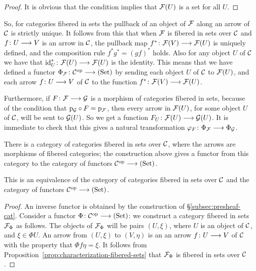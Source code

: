 \begin{3   FIBERED CATEGORIES}
\begin{3.4 Functors and cats fibered in sets}
\begin{proof}
It is obvious that the condition implies that $\mathcal{F}(U)$ is a set for all $U$.
\end{proof}


So, for categories fibered in sets the pullback of an object of $\mathcal{F}$ along an arrow of $\mathcal{C}$ is strictly unique. It follows from this that when $\mathcal{F}$ is fibered in sets over $\mathcal{C}$ and $f \colon U \arr V$ is an arrow in $\mathcal{C}$, the pullback map $f^* \colon \cF(V) \arr \cF(U)$ is uniquely defined, and the composition rule $f^*g^* = (gf)^*$ holds.  Also for any object $U$ of $\mathcal{C}$ we have that $\id_U^* \colon \cF(U) \arr \cF(U)$ is the identity. This means that we have defined a functor $\Phi_\cF \colon \cC\op \arr \catset$ by sending each object $U$ of $\mathcal{C}$ to $\mathcal{F}(U)$, and each arrow $f \colon U \arr V$ of $\mathcal{C}$ to the function $f^* \colon \cF(V) \arr \cF(U)$.

Furthermore, if $F \colon \cF \arr \cG$ is a morphism of categories fibered in sets, because of the condition that $\mathrm{p}_{\mathcal{G}} \circ F = \mathrm{p}_{\mathcal{F}}$, then every arrow in $\mathcal{F}(U)$, for some object $U$ of $\mathcal{C}$, will be sent to $\mathcal{G}(U)$. So we get a function $F_U \colon \cF(U) \arr \cG(U)$. It is immediate to check that this gives a natural transformation $\phi_F \colon \Phi_\cF \arr \Phi_\cG$.

There is a category of categories fibered in sets over $\mathcal{C}$, where the arrows are morphisms of fibered categories; the construction above gives a functor from this category to the category of functors $\cC\op \arr \catset$.

\begin{proposition}

This is an equivalence of the category of categories fibered in sets over $\mathcal{C}$ and the category of functors $\cC\op \arr \catset$.
\end{proposition}

\begin{proof} An inverse functor is obtained by the construction of \S\ref{subsec:presheaf-cat}. Consider a functor $\Phi \colon \cC\op \arr \catset $: we construct a category fibered in sets $\mathcal{F}_\Phi$ as follows. The objects of $\mathcal{F}_\Phi$ will be pairs $(U, \xi)$, where $U$ is an object of $\mathcal{C}$, and $\xi\in \Phi U$. An arrow from $(U, \xi)$ to $(V, \eta)$ is an an arrow $f \colon U \arr V$ of $\mathcal{C}$ with the property that $\Phi f \eta = \xi$. It follows from Proposition~\ref{prop:characterization-fibered-sets} that $\mathcal{F}_\Phi$ is fibered in sets over $\mathcal{C}$.


\end{proof}
\end{3.4 Functors and cats fibered in sets}
\end{3   FIBERED CATEGORIES}
